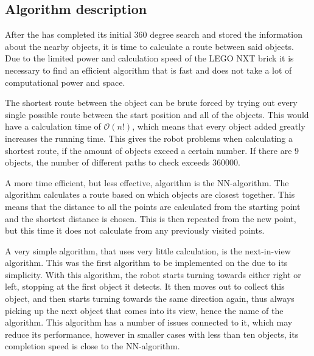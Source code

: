 \subsection{Algorithm description} \label{sec:algorithm-desc}

After the \projname{} has completed its initial 360 degree search and stored the information about the nearby objects, it is time to calculate a route between said objects. Due to the limited power and calculation speed of the LEGO NXT brick it is necessary to find an efficient algorithm that is fast and does not take a lot of computational power and space. 

The shortest route between the object can be brute forced by trying out every single possible route between the start position and all of the objects. This would have a calculation time of $\mathcal{O}(n!)$, which means that every object added greatly increases the running time. This gives the robot problems when calculating a shortest route, if the amount of objects exceed a certain number. If there are 9 objects, the number of different paths to check exceeds 360000. 

A more time efficient, but less effective, algorithm is the NN-algorithm. The algorithm calculates a route based on which objects are closest together. This means that the distance to all the points are calculated from the starting point and the shortest distance is chosen. This is then repeated from the new point, but this time it does not calculate from any previously visited points.

A very simple algorithm, that uses very little calculation, is the next-in-view algorithm. This was the first algorithm to be implemented on the \projname{} due to its simplicity. With this algorithm, the robot starts turning towards either right or left, stopping at the first object it detects. It then moves out to collect this object, and then starts turning towards the same direction again, thus always picking up the next object that comes into its view, hence the name of the algorithm. This algorithm has a number of issues connected to it, which may reduce its performance, however in smaller cases with less than ten objects, its completion speed is close to the NN-algorithm.

